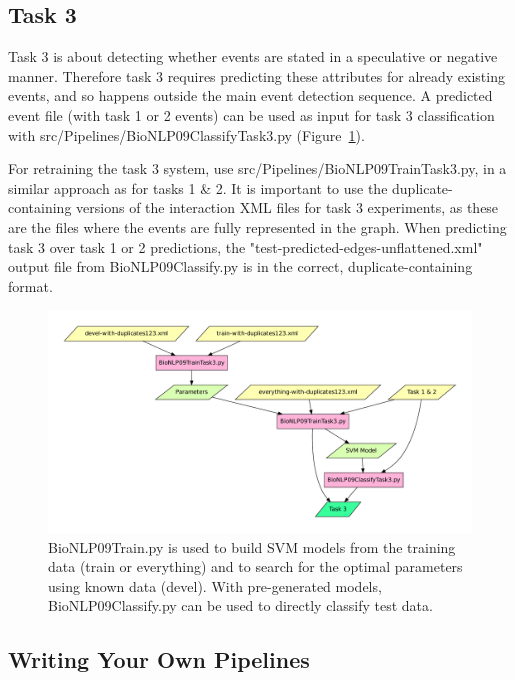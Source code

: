 \documentclass[a4paper,12pt]{article}
\begin{document}
\subsection{Task 3}

Task 3 is about detecting whether events are stated in a speculative or
negative manner. Therefore task 3 requires predicting these attributes for
already existing events, and so happens outside the main event detection
sequence. A predicted event file (with task 1 or 2 events) can be used as input
for task 3 classification with src/Pipelines/BioNLP09ClassifyTask3.py
(Figure~\ref{fig-programs3}). 

For retraining the task 3 system, use src/Pipelines/BioNLP09TrainTask3.py, in a
similar approach as for tasks 1 \& 2. It is important to use the
duplicate-containing versions of the interaction XML files for task 3
experiments, as these are the files where the events are fully represented in the
graph. When predicting task 3 over task 1 or 2 predictions, the
"test-predicted-edges-unflattened.xml" output file from BioNLP09Classify.py is in
the correct, duplicate-containing format.

\begin{figure}[h]
\begin{center}
\includegraphics[scale=0.5]{Figures/programs3.pdf}
\end{center}
\caption{BioNLP09Train.py is used to build SVM models from the training data
(train or everything) and to search for the optimal parameters using known data
(devel). With pre-generated models, BioNLP09Classify.py can be used to directly
classify test data.}
\label{fig-programs3}
\end{figure}

\subsection{Writing Your Own Pipelines}
\end{document}
